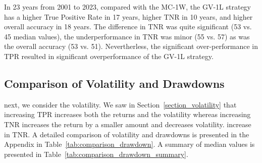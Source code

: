 \documentclass{article}
\begin{document}
In 23 years from 2001 to 2023, compared with the MC-1W, the GV-1L strategy has a higher True Positive Rate in 17 years, higher TNR in 10 years, and higher overall accuracy in 18 years. The difference in TNR was quite significant (53 vs. 45 median values),
the underperformance in TNR was minor (55 vs. 57) as was the overall accuracy (53 vs. 51). Nevertherless, 
the significant over-performance in TPR resulted in significant overperformance of the GV-1L strategy.

\subsection{Comparison of Volatility and Drawdowns}

next, we consider the volatility. We saw in Section~\ref{section_volatility} that increasing TPR increases both the returns and the volatility whereas increasing TNR increases the return by a smaller amount and decreases volatility. 
increase in TNR. A detailed comparison of volatility and drawdowns is presented in the Appendix
in Table~\ref{tab:comparison_drawdown}.
A summary of median values is presented in Table~\ref{tab:comparison_drawdown_summary}.
\end{document}
